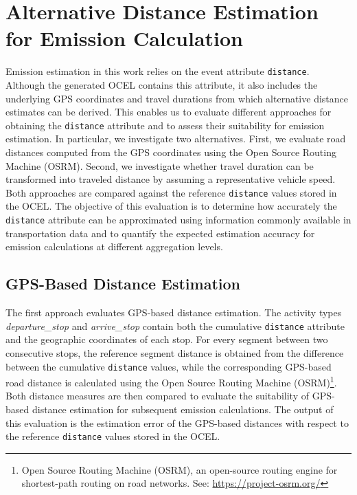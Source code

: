 \section{Alternative Distance Estimation for Emission Calculation}
Emission estimation in this work relies on the event attribute \texttt{distance}. Although the generated OCEL contains this attribute, it also includes the underlying GPS coordinates and travel durations from which alternative distance estimates can be derived. This enables us to evaluate different approaches for obtaining the \texttt{distance} attribute and to assess their suitability for emission estimation.
In particular, we investigate two alternatives. First, we evaluate road distances computed from the GPS coordinates using the Open Source Routing Machine (OSRM). Second, we investigate whether travel duration can be transformed into traveled distance by assuming a representative vehicle speed. Both approaches are compared against the reference \texttt{distance} values stored in the OCEL.
The objective of this evaluation is to determine how accurately the \texttt{distance} attribute can be approximated using information commonly available in transportation data and to quantify the expected estimation accuracy for emission calculations at different aggregation levels.

\subsection{GPS-Based Distance Estimation}
The first approach evaluates GPS-based distance estimation. The activity types \textit{departure\_stop} and \textit{arrive\_stop} contain both the cumulative \texttt{distance} attribute and the geographic coordinates of each stop. For every segment between two consecutive stops, the reference segment distance is obtained from the difference between the cumulative \texttt{distance} values, while the corresponding GPS-based road distance is calculated using the Open Source Routing Machine (OSRM)\footnote{Open Source Routing Machine (OSRM), an open-source routing engine for shortest-path routing on road networks. See: \url{https://project-osrm.org/}}. Both distance measures are then compared to evaluate the suitability of GPS-based distance estimation for subsequent emission calculations. The output of this evaluation is the estimation error of the GPS-based distances with respect to the reference \texttt{distance} values stored in the OCEL.


